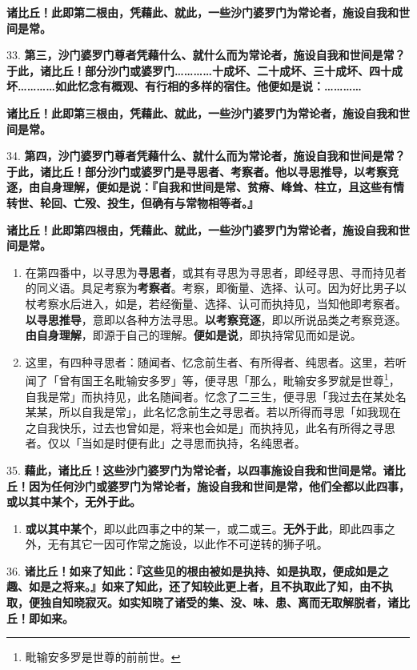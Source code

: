 \textbf{诸比丘！此即第二根由，凭藉此、就此，一些沙门婆罗门为常论者，施设自我和世间是常。}

{\Large 33.} \textbf{第三，沙门婆罗门尊者凭藉什么、就什么而为常论者，施设自我和世间是常？于此，诸比丘！部分沙门或婆罗门…………十成坏、二十成坏、三十成坏、四十成坏…………如此忆念有概观、有行相的多样的宿住。他便如是说：…………}

\textbf{诸比丘！此即第三根由，凭藉此、就此，一些沙门婆罗门为常论者，施设自我和世间是常。}

{\Large 34.} \textbf{第四，沙门婆罗门尊者凭藉什么、就什么而为常论者，施设自我和世间是常？于此，诸比丘！部分沙门或婆罗门是寻思者、考察者。他以寻思推导，以考察竞逐，由自身理解，便如是说：『自我和世间是常、贫瘠、峰耸、柱立，且这些有情转世、轮回、亡殁、投生，但确有与常物相等者。』}

\textbf{诸比丘！此即第四根由，凭藉此、就此，一些沙门婆罗门为常论者，施设自我和世间是常。}

\begin{enumerate}\item 在第四番中，以寻思为\textbf{寻思者}，或其有寻思为寻思者，即经寻思、寻而持见者的同义语。具足考察为\textbf{考察者}。考察，即衡量、选择、认可。因为好比男子以杖考察水后进入，如是，若经衡量、选择、认可而执持见，当知他即考察者。\textbf{以寻思推导}，意即以各种方法寻思。\textbf{以考察竞逐}，即以所说品类之考察竞逐。\textbf{由自身理解}，即源于自己的理解。\textbf{便如是说}，即执持常见而如是说。
\item 这里，有四种寻思者：随闻者、忆念前生者、有所得者、纯思者。这里，若听闻了「曾有国王名毗输安多罗」等，便寻思「那么，毗输安多罗就是世尊\footnote{毗输安多罗是世尊的前前世。}，自我是常」而执持见，此名随闻者。忆念了二三生，便寻思「我过去在某处名某某，所以自我是常」，此名忆念前生之寻思者。若以所得而寻思「如我现在之自我快乐，过去也曾如是，将来也会如是」而执持见，此名有所得之寻思者。仅以「当如是时便有此」之寻思而执持，名纯思者。\end{enumerate}

{\Large 35.} \textbf{藉此，诸比丘！这些沙门婆罗门为常论者，以四事施设自我和世间是常。诸比丘！因为任何沙门或婆罗门为常论者，施设自我和世间是常，他们全都以此四事，或以其中某个，无外于此。}

\begin{enumerate}\item \textbf{或以其中某个}，即以此四事之中的某一，或二或三。\textbf{无外于此}，即此四事之外，无有其它一因可作常之施设，以此作不可逆转的狮子吼。\end{enumerate}

{\Large 36.} \textbf{诸比丘！如来了知此：『这些见的根由被如是执持、如是执取，便成如是之趣、如是之将来。』如来了知此，还了知较此更上者，且不执取此了知，由不执取，便独自知晓寂灭。如实知晓了诸受的集、没、味、患、离而无取解脱者，诸比丘！即如来。}


